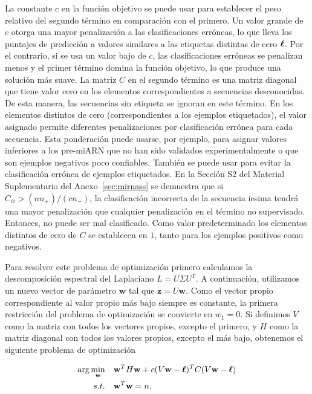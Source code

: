 La constante $ c $ en la función objetivo se puede usar para establecer el peso relativo del segundo término en comparación con el primero. Un valor grande de
$c$ otorga una mayor penalización a las clasificaciones erróneas, lo que lleva los puntajes de predicción a valores similares a las etiquetas distintas de cero
$ \boldsymbol\ell $. Por el contrario, si se usa un valor bajo de $ c $, las clasificaciones erróneas se penalizan menos y el primer término domina la función objetivo,
lo que produce una solución más suave. La matriz $C$ en el segundo término es una matriz diagonal que tiene valor cero en los elementos correspondientes a
secuencias desconocidas. De esta manera, las secuencias sin etiqueta se ignoran en este término. En los elementos distintos de cero (correspondientes a los
ejemplos etiquetados), el valor asignado permite diferentes penalizaciones por clasificación errónea para cada secuencia. Esta ponderación puede usarse, por
ejemplo, para asignar valores inferiores a los pre-miARN que no han sido validados experimentalmente o que son ejemplos negativos poco confiables. También se
puede usar para evitar la clasificación errónea de ejemplos etiquetados. En la Sección S2 del Material Suplementario del Anexo~\ref{sec:mirnass} se demuestra
que si $ C_ {ii}> (n n _ {+}) / (c n _ {-}) $, la clasificación incorrecta de la secuencia iesima tendrá una mayor penalización que cualquier penalización en
el término no supervisado. Entonces, no puede ser mal clasificado. Como valor predeterminado los elementos distintos de cero de $ C $ se establecen en $ 1 $,
tanto para los ejemplos positivos como negativos.

Para resolver este problema de optimización primero calculamos la descomposición espectral del Laplaciano $ L = U \Sigma U ^ T $. A continuación, utilizamos un
nuevo vector de parámetro $ \mathbf {w} $ tal que $ \mathbf {z} = U \mathbf {w} $. Como el vector propio correspondiente al valor propio más bajo siempre es
constante, la primera restricción del problema de optimización se convierte en $ w_ {1} = 0 $. Si definimos $ V $ como la matriz con todos los vectores propios,
excepto el primero, y $ H $ como la matriz diagonal con todos los valores propios, excepto el más bajo, obtenemos el siguiente problema de optimización

\begin{equation}
	\begin{split}
		\arg\min_{\mathbf{w}} & \quad \mathbf{w}^T H \mathbf{w} + c (V \mathbf{w} - \boldsymbol\ell)^T C (V \mathbf{w} - \boldsymbol\ell) \\
		s.t. & \quad \mathbf{w}^T \mathbf{w} = n.
	\end{split}
\end{equation}


